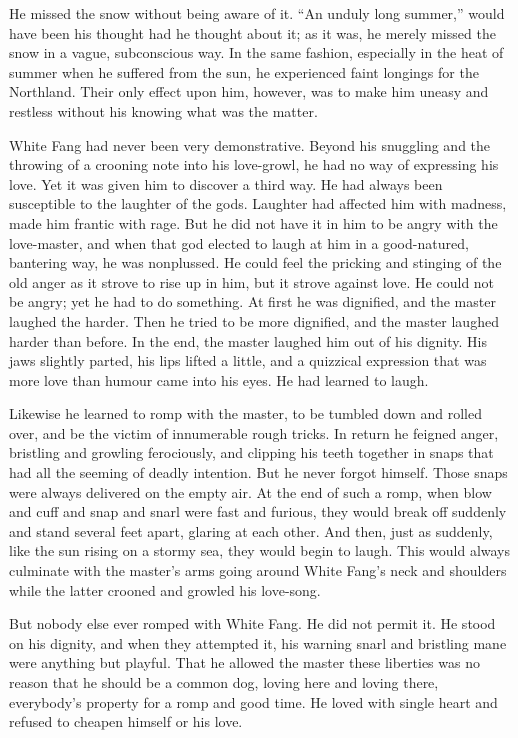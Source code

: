 \documentclass[10pt]{book}
\begin{document}
He missed the snow without being aware of it. “An unduly long summer,”
would have been his thought had he thought about it; as it was, he
merely missed the snow in a vague, subconscious way. In the same
fashion, especially in the heat of summer when he suffered from the
sun, he experienced faint longings for the Northland. Their only effect
upon him, however, was to make him uneasy and restless without his
knowing what was the matter.

White Fang had never been very demonstrative. Beyond his snuggling and
the throwing of a crooning note into his love-growl, he had no way of
expressing his love. Yet it was given him to discover a third way. He
had always been susceptible to the laughter of the gods. Laughter had
affected him with madness, made him frantic with rage. But he did not
have it in him to be angry with the love-master, and when that god
elected to laugh at him in a good-natured, bantering way, he was
nonplussed. He could feel the pricking and stinging of the old anger as
it strove to rise up in him, but it strove against love. He could not
be angry; yet he had to do something. At first he was dignified, and
the master laughed the harder. Then he tried to be more dignified, and
the master laughed harder than before. In the end, the master laughed
him out of his dignity. His jaws slightly parted, his lips lifted a
little, and a quizzical expression that was more love than humour came
into his eyes. He had learned to laugh.

Likewise he learned to romp with the master, to be tumbled down and
rolled over, and be the victim of innumerable rough tricks. In return
he feigned anger, bristling and growling ferociously, and clipping his
teeth together in snaps that had all the seeming of deadly intention.
But he never forgot himself. Those snaps were always delivered on the
empty air. At the end of such a romp, when blow and cuff and snap and
snarl were fast and furious, they would break off suddenly and stand
several feet apart, glaring at each other. And then, just as suddenly,
like the sun rising on a stormy sea, they would begin to laugh. This
would always culminate with the master’s arms going around White Fang’s
neck and shoulders while the latter crooned and growled his love-song.

But nobody else ever romped with White Fang. He did not permit it. He
stood on his dignity, and when they attempted it, his warning snarl and
bristling mane were anything but playful. That he allowed the master
these liberties was no reason that he should be a common dog, loving
here and loving there, everybody’s property for a romp and good time.
He loved with single heart and refused to cheapen himself or his love.
\end{document}
